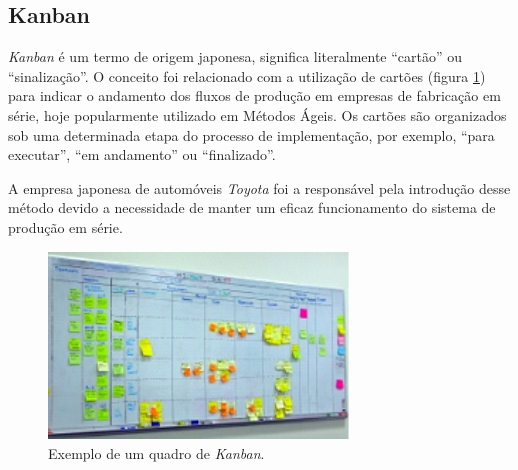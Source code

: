\subsection{Kanban}
\par \emph{Kanban} é um termo de origem japonesa, significa literalmente ``cartão'' ou ``sinalização''. O conceito foi relacionado com a utilização de cartões (figura \ref{fig:kanban_exemplo}) para indicar o andamento dos fluxos de produção em empresas de fabricação em série, hoje popularmente utilizado em Métodos Ágeis. Os cartões são organizados sob uma determinada etapa do processo de implementação, por exemplo, ``para executar'', ``em andamento'' ou ``finalizado''.
\par A empresa japonesa de automóveis \emph{Toyota} foi a responsável pela introdução desse método devido a necessidade de manter um eficaz funcionamento do sistema de produção em série.
\begin{figure}[!htb]
\centering
\includegraphics[width=8cm]{figuras/kanban_exemplo}
\caption{\label{fig:kanban_exemplo}Exemplo de um quadro de \emph{Kanban}.}
\end{figure}

